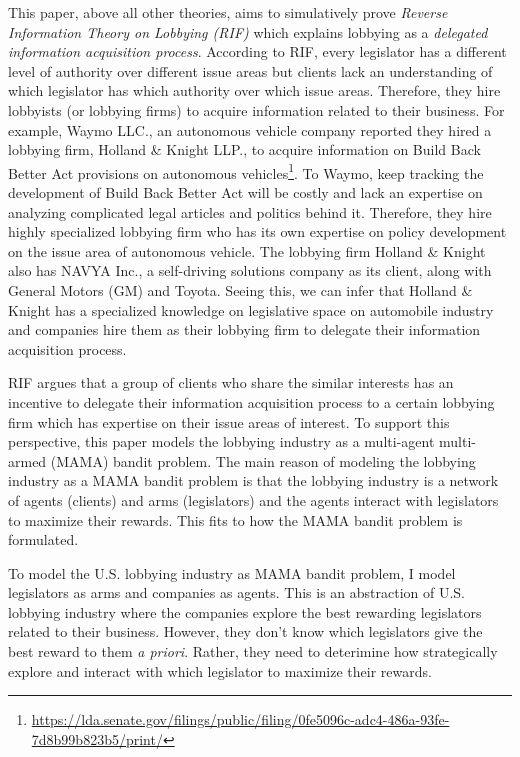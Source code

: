 \documentclass{article}
\begin{document}
This paper, above all other theories, aims to simulatively prove \textit{Reverse Information Theory on Lobbying (RIF)} \citep{rif} which explains lobbying as a \textit{delegated information acquisition process}.
According to RIF, every legislator has a different level of authority over different issue areas but clients lack an understanding of which legislator has which authority over which issue areas.
Therefore, they hire lobbyists (or lobbying firms) to acquire information related to their business.
For example, Waymo LLC., an autonomous vehicle company reported they hired a lobbying firm, Holland \& Knight LLP., to acquire information on Build Back Better Act provisions on autonomous vehicles\footnote{\url{https://lda.senate.gov/filings/public/filing/0fe5096c-adc4-486a-93fe-7d8b99b823b5/print/}}. 
To Waymo, keep tracking the development of Build Back Better Act will be costly and lack an expertise on analyzing complicated legal articles and politics behind it. Therefore, they hire highly specialized lobbying firm who has its own expertise on policy development on the issue area of autonomous vehicle. The lobbying firm Holland \& Knight also has NAVYA Inc., a self-driving solutions company as its client, along with General Motors (GM) and Toyota. Seeing this, we can infer that Holland \& Knight has a specialized knowledge on legislative space on automobile industry and companies hire them as their lobbying firm to delegate their information acquisition process.

RIF \citep{rif} argues that a group of clients who share the similar interests has an incentive to delegate their information acquisition process to a certain lobbying firm which has expertise on their issue areas of interest.
To support this perspective, this paper models the lobbying industry as a multi-agent multi-armed (MAMA) bandit problem. 
The main reason of modeling the lobbying industry as a MAMA bandit problem is that the lobbying industry is a network of agents (clients) and arms (legislators) and the agents interact with legislators to maximize their rewards.
This fits to how the MAMA bandit problem is formulated.

To model the U.S. lobbying industry as MAMA bandit problem, I model legislators as arms and companies as agents. 
This is an abstraction of U.S. lobbying industry where the companies explore the best rewarding legislators related to their business. However, they don't know which legislators give the best reward to them \textit{a priori}.
Rather, they need to deterimine how strategically explore and interact with which legislator to maximize their rewards.
\end{document}
